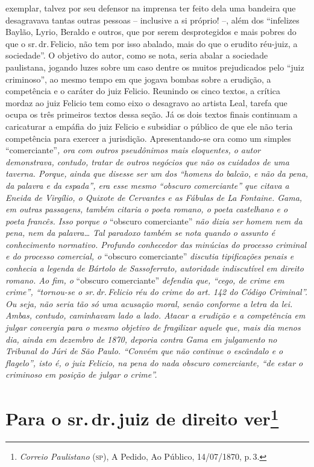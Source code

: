 \begin{argumento}
{exemplar, talvez por seu defensor na imprensa ter feito dela uma
bandeira que desagravava tantas outras pessoas -- inclusive a si
próprio! --, além dos ``infelizes Baylão, Lyrio, Beraldo e outros, que
por serem desprotegidos e mais pobres do que o sr.\,dr.\,Felicio, não tem
por isso abalado, mais do que o erudito réu-juiz, a sociedade''. O
objetivo do autor, como se nota, seria abalar a sociedade paulistana,
jogando luzes sobre um caso dentre os muitos prejudicados pelo ``juiz
criminoso'', ao mesmo tempo em que jogava bombas sobre a erudição, a
competência e o caráter do juiz Felicio. Reunindo os cinco textos, a
crítica mordaz ao juiz Felicio tem como eixo o desagravo ao artista
Leal, tarefa que ocupa os três primeiros textos dessa seção. Já os dois
textos finais continuam a caricaturar a empáfia do juiz Felicio e
subsidiar o público de que ele não teria competência para exercer a
jurisdição. Apresentando-se ora como um simples} ``comerciante''\emph{,
ora com outros pseudônimos mais eloquentes, o autor demonstrava,
contudo, tratar de outros negócios que não os cuidados de uma taverna.
Porque, ainda que disesse ser um dos ``homens do balcão, e não da pena,
da palavra e da espada'', era esse mesmo ``obscuro comerciante'' que citava
a Eneida de Virgílio, o Quixote de Cervantes e as Fábulas de La
Fontaine. Gama, em outras passagens, também citaria o poeta romano, o
poeta castelhano e o poeta francês. Isso porque o} ``obscuro comerciante''
\emph{não dizia ser homem nem da pena, nem da palavra\ldots{} Tal paradoxo
também se nota quando o assunto é conhecimento normativo. Profundo
conhecedor das minúcias do processo criminal e do processo comercial, o}
``obscuro comerciante'' \emph{discutia tipificações penais e conhecia a
legenda de Bártolo de Sassoferrato, autoridade indiscutível em direito
romano. Ao fim, o} ``obscuro comerciante'' \emph{defendia que, ``cego, de
crime em crime'', ``tornou-se o sr.\,dr.\,Felicio réu do crime do art. 142
do Código Criminal''. Ou seja, não seria tão só uma acusação moral, senão
conforme a letra da lei. Ambas, contudo, caminhavam lado a lado. Atacar
a erudição e a competência em julgar convergia para o mesmo objetivo de
fragilizar aquele que, mais dia menos dia, ainda em dezembro de 1870,
deporia contra Gama em julgamento no Tribunal do Júri de São Paulo.
``Convém que não continue o escândalo e o flagelo'', isto é, o juiz
Felicio, na pena do nada obscuro comerciante, ``de estar o criminoso em
posição de julgar o crime''.}
\end{argumento}

\chapter{Para o sr.\,dr.\,juiz de direito ver\footnote{\emph{Correio Paulistano} (\textsc{sp}), A Pedido, Ao Público,
  14/07/1870, p.\,3.}} %

